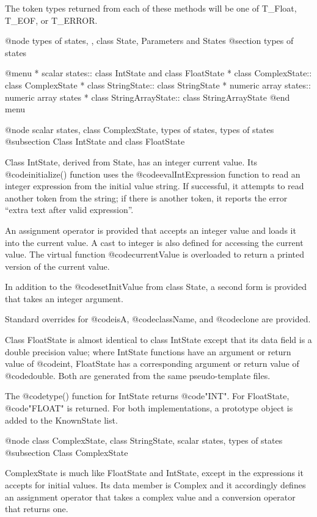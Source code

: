 The token types returned from each of these methods will be one of
T_Float, T_EOF, or T_ERROR.

@node types of states,  , class State, Parameters and States
@section types of states

@menu
* scalar states::               class IntState and class FloatState
* class ComplexState::          class ComplexState
* class StringState::           class StringState
* numeric array states::        numeric array states
* class StringArrayState::      class StringArrayState
@end menu

@node scalar states, class ComplexState, types of states, types of states
@subsection Class IntState and class FloatState

Class IntState, derived from State, has an integer current value.
Its @code{initialize()} function uses the @code{evalIntExpression}
function to read an integer expression from the initial value
string.  If successful, it attempts to read another token from
the string; if there is another token, it reports the error
``extra text after valid expression''.

An assignment operator is provided that accepts an integer value
and loads it into the current value.  A cast to integer is also
defined for accessing the current value.  The virtual function
@code{currentValue} is overloaded to return a printed version of
the current value.

In addition to the @code{setInitValue} from class State, a second
form is provided that takes an integer argument.

Standard overrides for @code{isA}, @code{className}, and @code{clone}
are provided.

Class FloatState is almost identical to class IntState except that
its data field is a double precision value; where IntState functions
have an argument or return value of @code{int}, FloatState has a
corresponding argument or return value of @code{double}.  Both are
generated from the same pseudo-template files.

The @code{type()} function for IntState returns @code{"INT"}.
For FloatState, @code{"FLOAT"} is returned.  For both implementations, a
prototype object is added to the KnownState list.

@node class ComplexState, class StringState, scalar states, types of states
@subsection Class ComplexState

ComplexState is much like FloatState and IntState, except in the
expressions it accepts for initial values.  Its data member is
Complex and it accordingly defines an assignment operator that takes a
complex value and a conversion operator that returns one.

